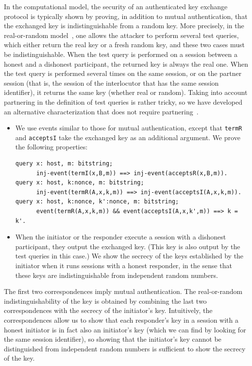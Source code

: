 \documentclass{book}
\begin{document}
In the computational model, the security of an authenticated key
exchange protocol is typically shown by proving, in addition to mutual
authentication, that the exchanged key is indistinguishable from a
random key.  More precisely, in the real-or-random
model~\cite{Abdalla06}, one allows the attacker to perform several
test queries, which either return the real key or a fresh random key,
and these two cases must be indistinguishable.  When the test query is
performed on a session between a honest and a dishonest participant,
the returned key is always the real one.  When the test query is
performed several times on the same session, or on the partner session
(that is, the session of the interlocutor that has the same session
identifier), it returns the same key (whether real or random).  Taking
into account partnering in the definition of test queries is rather
tricky, so we have developed an alternative characterization that does
not require partnering~\cite{Blanchet07}.
\begin{itemize}

\item We use events similar to those for mutual authentication, except that
\lstinline!termR! and \lstinline!acceptsI! take the exchanged key as an additional argument.
We prove the following properties:
\begin{lstlisting}[numbers=none]
query x: host, m: bitstring;
      inj-event(termI(x,B,m)) ==> inj-event(acceptsR(x,B,m)).
query x: host, k:nonce, m: bitstring;
      inj-event(termR(A,x,k,m)) ==> inj-event(acceptsI(A,x,k,m)).
query x: host, k:nonce, k':nonce, m: bitstring;
      event(termR(A,x,k,m)) && event(acceptsI(A,x,k',m)) ==> k = k'.
\end{lstlisting}

\item When the initiator or the responder execute a session with a
  dishonest participant, they output the exchanged key. (This key is
  also output by the test queries in this case.) We show the secrecy
  of the keys established by the initiator when it runs sessions with a
  honest responder, in the sense that these keys are indistinguishable
  from independent random numbers.

\end{itemize}
The first two correspondences imply mutual authentication.  The
real-or-random indistinguishability of the key is obtained by
combining the last two correspondences with the secrecy of the
initiator's key. Intuitively, the correspondences allow us to show
that each responder's key in a session with a honest initiator is in
fact also an initiator's key (which we can find by looking for the
same session identifier), so showing that the initiator's key cannot
be distinguished from independent random numbers is sufficient to show
the secrecy of the key.
\end{document}
